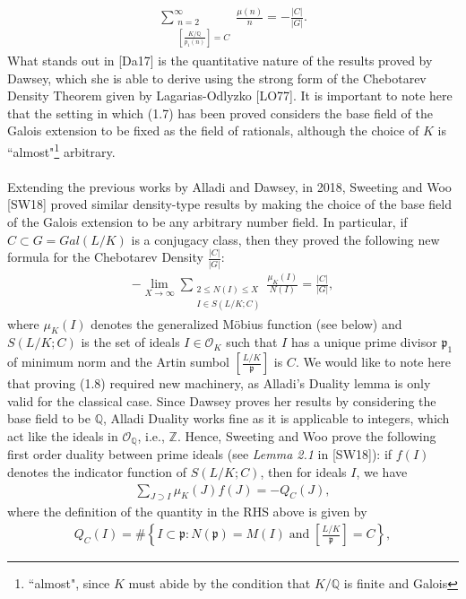 \documentclass[12pt]{article}
\numberwithin{equation}{section}
\numberwithin{equation}{section}
\begin{document}
\begin{align}
     \sum_{\substack{n=2 \\ \left[\frac{K/\mathbb{Q}}{p_1(n)}\right]=C}}^{\infty}\frac{\mu(n)}{n} = -\frac{|C|}{|G|}.
\end{align}
What stands out in [Da17] is the quantitative nature of the results proved by Dawsey, which she is able to derive using the strong form of the Chebotarev Density Theorem given by Lagarias-Odlyzko [LO77]. It is important to note here that the setting in which (1.7) has been proved considers the base field of the Galois extension to be fixed as the field of rationals, although the choice of $K$ is ``almost"\footnote[1]{``almost", since $K$ must abide by the condition that $K/\mathbb{Q}$ is finite and Galois} arbitrary. \\ \\
Extending the previous works by Alladi and Dawsey, in 2018, Sweeting and Woo [SW18] proved similar density-type results by making the choice of the base field of the Galois extension to be any arbitrary number field. In particular, if $C\subset G=Gal(L/K)$ is a conjugacy class, then they proved the following new formula for the Chebotarev Density $\frac{|C|}{|G|}$:
\begin{align}
    -\lim_{X\to \infty} \sum_{\substack{2 \leq N(I)\leq X \\ I \in S(L/K;C)}} \frac{\mu_K(I)}{N(I)} = \frac{|C|}{|G|},
\end{align}
where $\mu_K(I)$ denotes the generalized M\"obius function (see below) and $S(L/K;C)$ is the set of ideals $I \in \mathcal{O}_K$ such that $I$ has a unique prime divisor $\mathfrak{p}_1$ of minimum norm and the Artin sumbol $\left[\frac{L/K}{\mathfrak{p}}\right]$ is $C$. We would like to note here that proving (1.8) required new machinery, as Alladi's Duality lemma is only valid for the classical case. Since Dawsey proves her results by considering the base field to be $\mathbb{Q}$, Alladi Duality works fine as it is applicable to integers, which act like the ideals in $\mathcal{O}_{\mathbb{Q}}$, i.e., $\mathbb{Z}$. Hence, Sweeting and Woo prove the following first order duality between prime ideals (see \textit{Lemma 2.1} in [SW18]): if $f(I)$ denotes the indicator function of $S(L/K;C)$, then for ideals $I$, we have
\begin{align}
    \sum_{J \supset I}\mu_K(J)f(J) =-Q_C(J),
\end{align}
where the definition of the quantity in the RHS above is given by
\begin{align}
    Q_C(I) = \#\left\{I \subset \mathfrak{p}:N(\mathfrak{p})=M(I)\;\text{and}\;\left[\frac{L/K}{\mathfrak{p}}\right]=C\right\},
\end{align}
\end{document}
